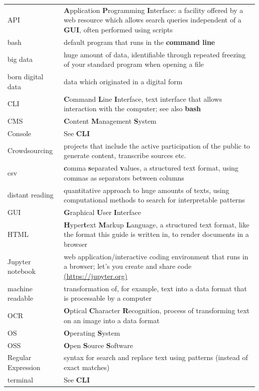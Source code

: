 \documentclass[
  letterpaper,
]{book}
\begin{document}
\begin{longtable}[]{@{}
  >{\raggedright\arraybackslash}p{}
  >{\raggedright\arraybackslash}p{}@{}}
\toprule()
\endhead
API & \textbf{A}pplication \textbf{P}rogramming \textbf{I}nterface: a
facility offered by a web resource which allows search queries
independent of a \textbf{GUI}, often performed using scripts \\
bash & default program that runs in the \textbf{command line} \\
big data & huge amount of data, identifiable through repeated freezing
of your standard program when opening a file \\
born digital data & data which originated in a digital form \\
CLI & \textbf{C}ommand \textbf{L}ine \textbf{I}nterface, text interface
that allows interaction with the computer; see also \textbf{bash} \\
CMS & \textbf{C}ontent \textbf{M}anagement \textbf{S}ystem \\
Console & See \textbf{CLI} \\
Crowdsourcing & projects that include the active participation of the
public to generate content, transcribe sources etc. \\
csv & \textbf{c}omma \textbf{s}eparated \textbf{v}alues, a structured
text format, using commas as separators between columns \\
distant reading & quantitative approach to huge amounts of texts, using
computational methods to search for interpretable patterns \\
GUI & \textbf{G}raphical \textbf{U}ser \textbf{I}nterface \\
HTML & \textbf{H}yper\textbf{t}ext \textbf{M}arkup \textbf{L}anguage, a
structured text format, like the format this guide is written in, to
render documents in a browser \\
Jupyter notebook & web application/interactive coding environment that
runs in a browser; let's you create and share code
\href{https://jupyter.org}{(https://jupyter.org)} \\
machine readable & transformation of, for example, text into a data
format that is processable by a computer \\
OCR & \textbf{O}ptical \textbf{C}haracter \textbf{R}ecognition, process
of transforming text on an image into a data format \\
OS & \textbf{O}perating \textbf{S}ystem \\
OSS & \textbf{O}pen \textbf{S}ource \textbf{S}oftware \\
Regular Expression & syntax for search and replace text using patterns
(instead of exact matches) \\
terminal & See \textbf{CLI} \\
\bottomrule()
\end{longtable}
\end{document}

